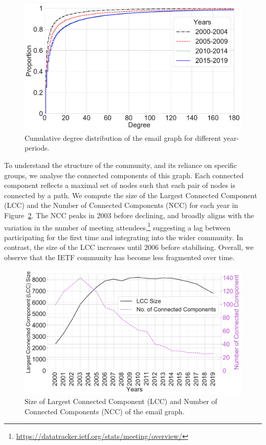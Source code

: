 \documentclass[twocolumn,10pt]{article}
\newlength{\figureWidthOneColumn}
\begin{document}
\begin{figure}
  \centering
  \includegraphics[width=\figureWidthOneColumn]{figures-prev/icwsm-2022/degree_CDF.pdf}
  \caption{
    Cumulative degree distribution of the email graph for different
    year-periods.
  }
  \label{fig:degree_cdf}
\end{figure}

To understand the structure of the community, and its reliance on specific
groups, we analyse the connected components of this graph. Each connected
component reflects a maximal set of nodes such that each pair of nodes is
connected by a path. We compute the size of the Largest Connected Component
(LCC) and the Number of Connected Components (NCC) for each year in
Figure~\ref{fig:lcc_size_yearly}.  The NCC peaks in 2003 before declining,
and broadly aligns with the variation in the number of meeting
attendees,\footnote{\url{https://datatracker.ietf.org/stats/meeting/overview/}}
suggesting a lag between participating for the first time and integrating
into the wider community.  In contrast, the size of the LCC increases until
2006 before stabilising.  Overall, we observe that the IETF community has
become less fragmented over time.

\begin{figure}
  \centering
  \includegraphics[width=\figureWidthOneColumn]{figures-prev/icwsm-2022/lcc_yearly_no_components.pdf}
  \caption{
    Size of Largest Connected Component (LCC) and Number of Connected
    Components (NCC) of the email graph.
  }
  \label{fig:lcc_size_yearly}
\end{figure}
\end{document}
